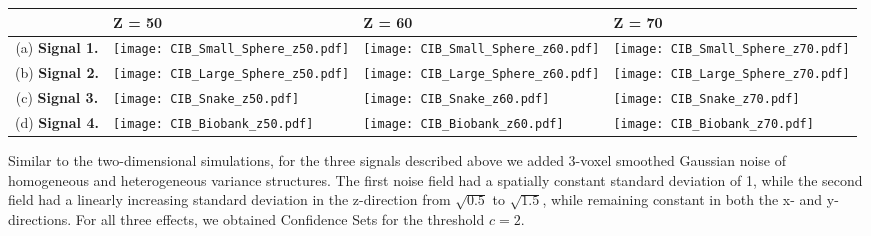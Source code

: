 \begin{table}[htbp]
\hspace*{-0.5cm}
\begin{adjustbox}{center}
\centering
    \begin{tabular}{cm{50mm}m{50mm}m{50mm}}
       \toprule
         & \hspace{15.5mm} Z = 50 & \hspace{15.5mm} Z = 60 & \hspace{15.5mm} Z = 70 \\
        \midrule
        (a) \textbf{Signal 1.} & \texttt{[image: CIB\_Small\_Sphere\_z50.pdf]} & \texttt{[image: CIB\_Small\_Sphere\_z60.pdf]} & \texttt{[image: CIB\_Small\_Sphere\_z70.pdf]} \\
        (b) \textbf{Signal 2.} & \texttt{[image: CIB\_Large\_Sphere\_z50.pdf]} & \texttt{[image: CIB\_Large\_Sphere\_z60.pdf]} & \texttt{[image: CIB\_Large\_Sphere\_z70.pdf]} \\
        (c) \textbf{Signal 3.} & \texttt{[image: CIB\_Snake\_z50.pdf]} & \texttt{[image: CIB\_Snake\_z60.pdf]} & \texttt{[image: CIB\_Snake\_z70.pdf]} \\
        (d) \textbf{Signal 4.} & \texttt{[image: CIB\_Biobank\_z50.pdf]} & \texttt{[image: CIB\_Biobank\_z60.pdf]} & \texttt{[image: CIB\_Biobank\_z70.pdf]} \\
        \bottomrule
    \end{tabular}
\end{adjustbox}
    \label{tbl:3D_figures}
\end{table}

Similar to the two-dimensional simulations, for the three signals described above we added 3-voxel smoothed Gaussian noise of homogeneous and heterogeneous variance structures. The first noise field had a spatially constant standard deviation of 1, while the second field had a linearly increasing standard deviation in the z-direction from $\sqrt{0.5}$ to $\sqrt{1.5}$, while remaining constant in both the x- and y- directions. For all three effects, we obtained Confidence Sets for the threshold $c = 2$. 

